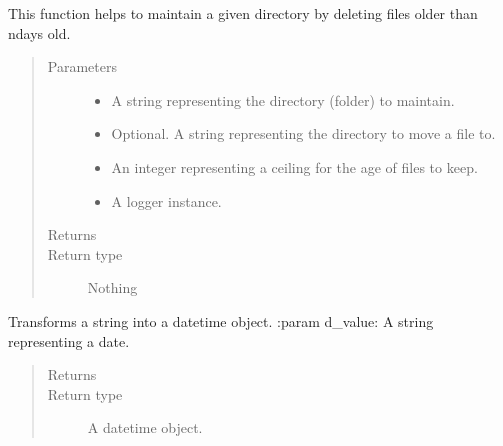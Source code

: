 \documentclass[letterpaper,10pt,english]{sphinxmanual}
\begin{document}
\begin{fulllineitems}
\label{\detokenize{index:ListManagement.utility.general.auto_maintain}}
This function helps to maintain a given directory by deleting files older than ndays old.
\begin{quote}\begin{description}
\item[{Parameters}] \leavevmode\begin{itemize}
\item {} 
 \textendash{} A string representing the directory (folder) to maintain.

\item {} 
 \textendash{} Optional. A string representing the directory to move a file to.

\item {} 
 \textendash{} An integer representing a ceiling for the age of files to keep.

\item {} 
 \textendash{} A logger instance.

\end{itemize}

\item[{Returns}] \leavevmode


\item[{Return type}] \leavevmode
Nothing

\end{description}\end{quote}

\end{fulllineitems}


\begin{fulllineitems}
\label{\detokenize{index:ListManagement.utility.general.clean_date_values}}
Transforms a string into a datetime object.
:param d\_value: A string representing a date.
\begin{quote}\begin{description}
\item[{Returns}] \leavevmode


\item[{Return type}] \leavevmode
A datetime object.

\end{description}\end{quote}

\end{fulllineitems}
\end{document}
